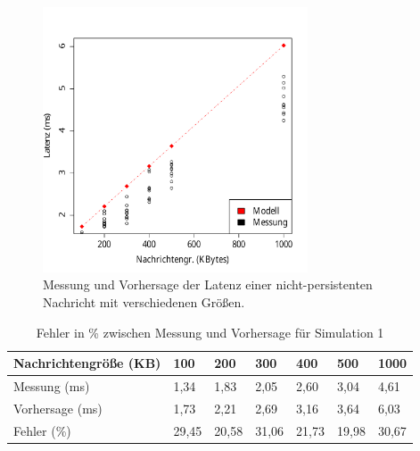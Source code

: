 \begin{figure}
\center
  \includegraphics[width=0.7\textwidth]{images/modelSimulationResults/simulation1.pdf}
  \caption{Messung und Vorhersage der Latenz einer nicht-persistenten Nachricht mit verschiedenen Größen.}
  \label{img:simulation1}
\end{figure}

\begin{table}
\centering
  \begin{tabular}{| l | l | l | l |l | l | l |}
    \hline
    Nachrichtengröße (KB) & 100 & 200 & 300 & 400 & 500 & 1000 \\ \hline
    Messung (ms) & 1,34 & 1,83 & 2,05 & 2,60 & 3,04 & 4,61\\ \hline
    Vorhersage (ms) & 1,73 & 2,21 & 2,69 & 3,16 & 3,64 & 6,03\\ \hline
    Fehler (\%) & 29,45 & 20,58 & 31,06 & 21,73 & 19,98 & 30,67\\ \hline
    
    \hline
      \end{tabular}
	\caption{\label{tab:sim1} Fehler in \% zwischen Messung und Vorhersage für Simulation 1}
\end{table}






